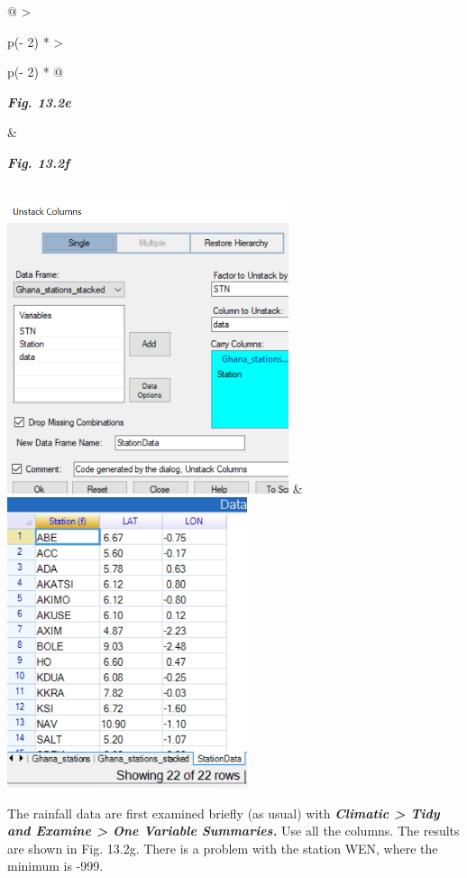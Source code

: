 \documentclass[
  letterpaper,
  DIV=11,
  numbers=noendperiod]{scrreprt}
\begin{document}
\begin{longtable}[]{@{}
  >{\raggedright\arraybackslash}p{(\columnwidth - 2\tabcolsep) * }
  >{\raggedright\arraybackslash}p{(\columnwidth - 2\tabcolsep) * }@{}}
\toprule\noalign{}
\begin{minipage}[b]{\linewidth}\raggedright
\textbf{\emph{Fig. 13.2e}}
\end{minipage} & \begin{minipage}[b]{\linewidth}\raggedright
\textbf{\emph{Fig. 13.2f}}
\end{minipage} \\
\midrule\noalign{}
\endhead
\bottomrule\noalign{}
\endlastfoot
\includegraphics[width=3.25053in,height=3.36062in]{figures/Fig13.2e.png}
&
\includegraphics[width=2.77208in,height=3.35034in]{figures/Fig13.2f.png} \\
\end{longtable}

The rainfall data are first examined briefly (as usual) with
\textbf{\emph{Climatic \textgreater{} Tidy and Examine \textgreater{}
One Variable Summaries.}} Use all the columns. The results are shown in
Fig. 13.2g. There is a problem with the station WEN, where the minimum
is -999.
\end{document}
